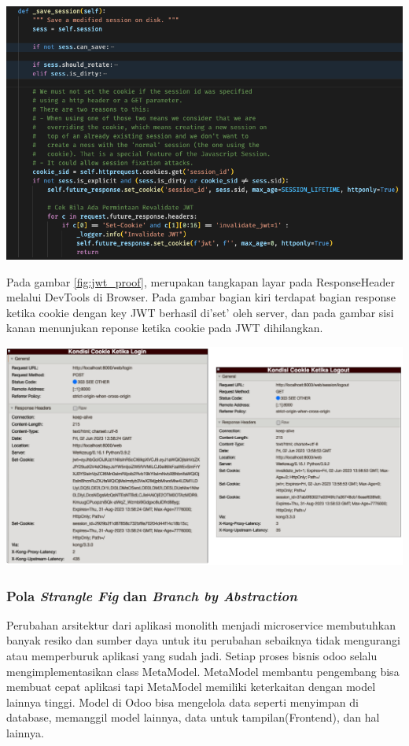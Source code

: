 \begin{center}
	\includegraphics[width=14cm]{img/bab_4/removeCookie.png}
	\label{fig:removeCookie}
\end{center}

Pada gambar \ref{fig:jwt_proof}, merupakan tangkapan layar pada ResponseHeader melalui DevTools di Browser. Pada gambar bagian kiri terdapat bagian response ketika cookie dengan key JWT berhasil di'set' oleh server, dan pada gambar sisi kanan menunjukan reponse ketika cookie pada JWT dihilangkan.

\begin{center}
	\includegraphics[width=14cm]{img/bab_4/jwt_proof.png}
	\label{fig:jwt_proof}
\end{center}


\subsubsection{Pola \textit{Strangle Fig} dan \textit{Branch by Abstraction}}
Perubahan arsitektur dari aplikasi monolith menjadi microservice membutuhkan banyak resiko dan sumber daya untuk itu perubahan sebaiknya tidak mengurangi atau memperburuk aplikasi yang sudah jadi. Setiap proses bisnis odoo selalu mengimplementasikan class MetaModel. MetaModel membantu pengembang bisa membuat cepat aplikasi tapi MetaModel memiliki keterkaitan dengan model lainnya tinggi. Model di Odoo bisa mengelola data seperti menyimpan di database, memanggil model lainnya, data untuk tampilan(Frontend), dan hal lainnya.

